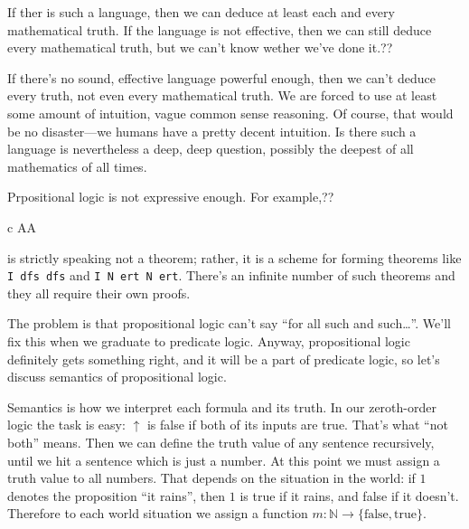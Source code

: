 \documentclass[11pt,oneside,%
]{memoir}
\newenvironment{eqna}{\begin{IEEEeqnarray}{c}}{\end{IEEEeqnarray}\ignorespacesafterend}
\theoremstyle{definition}
\newcommand{\NN}{\mathbb{N}}
\newcommand{\propositio}{\lstinline[language=propositio]}
\begin{document}
If ther is such a language, then we can deduce at least each and every mathematical truth. If the language is not effective, then we can still deduce every mathematical truth, but we can't know wether we've done it.??

If there's no sound, effective language powerful enough, then we can't deduce every truth, not even every mathematical truth. We are forced to use at least some amount of intuition, vague common sense reasoning. Of course, that would be no disaster---we humans have a pretty decent intuition. Is there such a language is nevertheless a deep, deep question, possibly the deepest of all mathematics of all times.

Prpositional logic is not expressive enough. For example,??
\begin{eqna}
    A\rightarrow A
\end{eqna}
is strictly speaking not a theorem; rather, it is a scheme for forming theorems like \propositio!I dfs dfs! and \propositio!I N ert N ert!. There's an infinite number of such theorems and they all require their own proofs.

The problem is that propositional logic can't say ``for all such and such\ldots''. We'll fix this when we graduate to predicate logic. Anyway, propositional logic definitely gets something right, and it will be a part of predicate logic, so let's discuss semantics of propositional logic.

Semantics is how we interpret each formula and its truth. In our zeroth-order logic the task is easy: \(\uparrow\) is false if both of its inputs are true. That's what ``not both'' means. Then we can define the truth value of any sentence recursively, until we hit a sentence which is just a number. At this point we must assign a truth value to all numbers. That depends on the situation in the world: if \(1\) denotes the proposition ``it rains'', then \(1\) is true if it rains, and false if it doesn't. Therefore to each world situation we assign a function \(m:\NN\rightarrow\lbrace\text{false},\text{true}\rbrace\).
\end{document}
